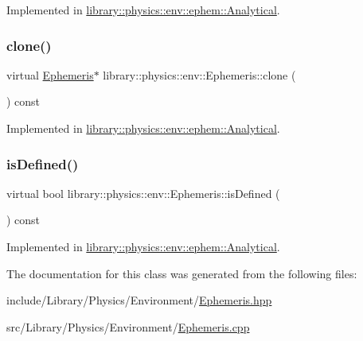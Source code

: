 Implemented in \hyperlink{classlibrary_1_1physics_1_1env_1_1ephem_1_1_analytical_ad16f575a7804bd29710030289d5630b1}{library\+::physics\+::env\+::ephem\+::\+Analytical}.

\mbox{\label{classlibrary_1_1physics_1_1env_1_1_ephemeris_a7ddecd88d91f79ff204100eb9607b591}} 
\subsubsection{\texorpdfstring{clone()}{clone()}}
{\footnotesize\ttfamily virtual \hyperlink{classlibrary_1_1physics_1_1env_1_1_ephemeris}{Ephemeris}$\ast$ library\+::physics\+::env\+::\+Ephemeris\+::clone (\begin{DoxyParamCaption}{ }\end{DoxyParamCaption}) const\hspace{0.3cm}{\ttfamily [pure virtual]}}



Implemented in \hyperlink{classlibrary_1_1physics_1_1env_1_1ephem_1_1_analytical_acd51ca99177b1433b6623829ae003bec}{library\+::physics\+::env\+::ephem\+::\+Analytical}.

\mbox{\label{classlibrary_1_1physics_1_1env_1_1_ephemeris_abf61a03e24dd146199381db14d1d7c68}} 
\subsubsection{\texorpdfstring{is\+Defined()}{isDefined()}}
{\footnotesize\ttfamily virtual bool library\+::physics\+::env\+::\+Ephemeris\+::is\+Defined (\begin{DoxyParamCaption}{ }\end{DoxyParamCaption}) const\hspace{0.3cm}{\ttfamily [pure virtual]}}



Implemented in \hyperlink{classlibrary_1_1physics_1_1env_1_1ephem_1_1_analytical_a0c0fe5d8326ba439bb0b51e7536ab0fd}{library\+::physics\+::env\+::ephem\+::\+Analytical}.



The documentation for this class was generated from the following files\+:\begin{DoxyCompactItemize}
\item 
include/\+Library/\+Physics/\+Environment/\hyperlink{_ephemeris_8hpp}{Ephemeris.\+hpp}\item 
src/\+Library/\+Physics/\+Environment/\hyperlink{_ephemeris_8cpp}{Ephemeris.\+cpp}\end{DoxyCompactItemize}
